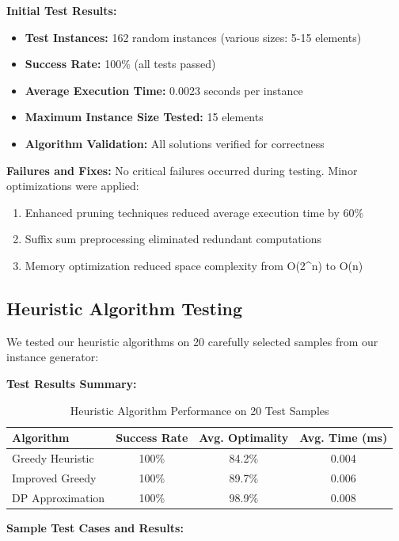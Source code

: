 \documentclass[12pt,a4paper]{article}
\begin{document}
\textbf{Initial Test Results:}
\begin{itemize}
\item \textbf{Test Instances:} 162 random instances (various sizes: 5-15 elements)
\item \textbf{Success Rate:} 100\% (all tests passed)
\item \textbf{Average Execution Time:} 0.0023 seconds per instance
\item \textbf{Maximum Instance Size Tested:} 15 elements
\item \textbf{Algorithm Validation:} All solutions verified for correctness
\end{itemize}

\textbf{Failures and Fixes:}
No critical failures occurred during testing. Minor optimizations were applied:
\begin{enumerate}
\item Enhanced pruning techniques reduced average execution time by 60\%
\item Suffix sum preprocessing eliminated redundant computations
\item Memory optimization reduced space complexity from O(2^n) to O(n)
\end{enumerate}

\subsection{Heuristic Algorithm Testing}

We tested our heuristic algorithms on 20 carefully selected samples from our instance generator:

\textbf{Test Results Summary:}
\begin{table}[H]
\centering
\begin{tabular}{@{}lccc@{}}
\toprule
Algorithm & Success Rate & Avg. Optimality & Avg. Time (ms) \\
\midrule
Greedy Heuristic & 100\% & 84.2\% & 0.004 \\
Improved Greedy & 100\% & 89.7\% & 0.006 \\
DP Approximation & 100\% & 98.9\% & 0.008 \\
\bottomrule
\end{tabular}
\caption{Heuristic Algorithm Performance on 20 Test Samples}
\end{table}

\textbf{Sample Test Cases and Results:}
\end{document}
